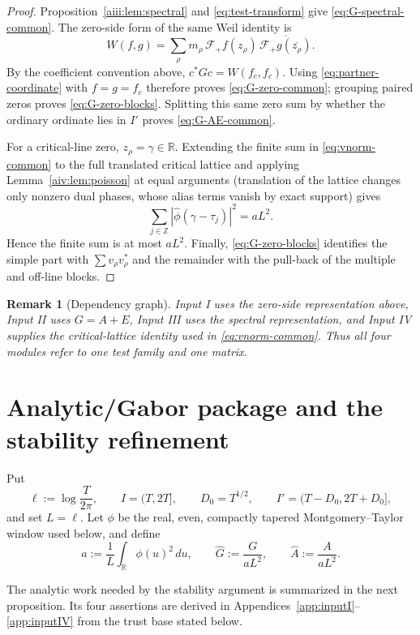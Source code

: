 \documentclass[11pt]{article}
\newtheorem{remark}[theorem]{Remark}
\newcommand{\R}{\mathbb R}
\begin{document}
\begin{proof}
Proposition~\ref{aiii:lem:spectral} and
\eqref{eq:test-transform} give \eqref{eq:G-spectral-common}. The zero-side
form of the same Weil identity is
\[
 W(f,g)=\sum_\rho m_\rho\,
 \mathcal F_+f(z_\rho)\,
 \overline{\mathcal F_+g(\overline{z_\rho})}.
\]
By the coefficient convention above,
$c^*Gc=W(f_c,f_c)$.  Using \eqref{eq:partner-coordinate} with
$f=g=f_c$ therefore proves \eqref{eq:G-zero-common}; grouping paired zeros
proves
\eqref{eq:G-zero-blocks}. Splitting this same zero sum by whether the ordinary
ordinate lies in $I'$ proves \eqref{eq:G-AE-common}.

For a critical-line zero, $z_\rho=\gamma\in\R$. Extending the finite sum in
\eqref{eq:vnorm-common} to the full translated critical lattice and applying
Lemma~\ref{aiv:lem:poisson} at equal arguments (translation of the lattice
changes only nonzero dual phases, whose alias terms vanish by exact support)
gives
\[
 \sum_{j\in\mathbb Z}|\widehat\phi(\gamma-\tau_j)|^2=aL^2.
\]
Hence the finite sum is at most $aL^2$. Finally,
\eqref{eq:G-zero-blocks} identifies the simple part with
$\sum v_\rho v_\rho^*$ and the remainder with the pull-back of the multiple
and off-line blocks.
\end{proof}

\begin{remark}[Dependency graph]
Input I uses the zero-side representation above, Input II uses $G=A+E$,
Input III uses the spectral representation, and Input IV supplies the
critical-lattice identity used in \eqref{eq:vnorm-common}.  Thus all four
modules refer to one test family and one matrix.
\end{remark}


\section{Analytic/Gabor package and the stability refinement}\label{sec:analytic}

Put
\[
 \ell:=\log\frac{T}{2\pi},\qquad I=(T,2T],\qquad
 D_0=T^{1/2},\qquad I'=(T-D_0,2T+D_0],
\]
and set $L=\ell$.  Let $\phi$ be the real, even, compactly tapered
Montgomery--Taylor window used below, and define
\[
 a:=\frac1L\int_{\R}\phi(u)^2\,du,\qquad
 \widehat G:=\frac{G}{aL^2},\qquad
 \widehat A:=\frac{A}{aL^2}.
\]

The analytic work needed by the stability argument is summarized in the next
proposition.  Its four assertions are derived in
Appendices~\ref{app:inputI}--\ref{app:inputIV} from the trust base stated below.
\end{document}
